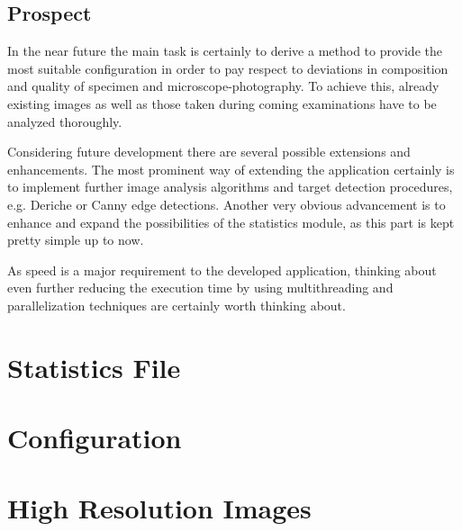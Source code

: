 \documentclass[a4paper, 12pt, twoside]{article}
\begin{document}
\subsection{Prospect}
In the near future the main task is certainly to derive a method to provide the
most suitable configuration in order to pay respect to deviations in
composition and quality of specimen and microscope-photography. To achieve this,
already existing images as well as those taken during coming examinations have
to be analyzed thoroughly.

Considering future development there are several possible extensions and
enhancements. The most prominent way of extending the application certainly is
to implement further image analysis algorithms and target detection procedures,
e.g. Deriche or Canny edge detections. Another very obvious advancement is to
enhance and expand the possibilities of the statistics module, as this part
is kept pretty simple up to now.

As speed is a major requirement to the developed application, thinking about
even further reducing the execution time by using multithreading and
parallelization techniques are certainly worth thinking about.

\newpage
{}


\newpage
\thispagestyle{empty}
\mbox{}

\newpage
\appendix

\section{Statistics File}


\newpage
\section{Configuration}


\newpage
\section{High Resolution Images}
\end{document}
